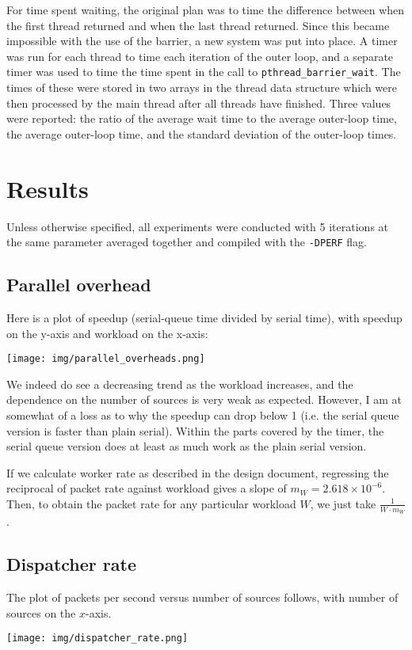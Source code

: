 \documentclass{article}
\begin{document}
For time spent waiting, the original plan was to time the difference between when the first thread returned and when the last thread returned. Since this became impossible with the use of the barrier, a new system was put into place. A timer was run for each thread to time each iteration of the outer loop, and a separate timer was used to time the time spent in the call to \verb|pthread_barrier_wait|. The times of these were stored in two arrays in the thread data structure which were then processed by the main thread after all threads have finished. Three values were reported: the ratio of the average wait time to the average outer-loop time, the average outer-loop time, and the standard deviation of the outer-loop times. 
\section*{Results}
Unless otherwise specified, all experiments were conducted with 5 iterations at the same parameter averaged together and compiled with the \verb|-DPERF| flag.
\subsection*{Parallel overhead}
Here is a plot of speedup (serial-queue time divided by serial time), with speedup on the y-axis and workload on the x-axis:

\texttt{[image: img/parallel\_overheads.png]}

We indeed do see a decreasing trend as the workload increases, and the dependence on the number of sources is very weak as expected. However, I am at somewhat of a loss as to why the speedup can drop below 1 (i.e. the serial queue version is faster than plain serial). Within the parts covered by the timer, the serial queue version does at least as much work as the plain serial version. 

If we calculate worker rate as described in the design document, regressing the reciprocal of packet rate against workload gives a slope of $m_W=2.618\times10^{-6}$. Then, to obtain the packet rate for any particular workload $W$, we just take $\frac{1}{W\cdot m_W}$.
\subsection*{Dispatcher rate}
The plot of packets per second versus number of sources follows, with number of sources on the $x$-axis.

\texttt{[image: img/dispatcher\_rate.png]}
\end{document}
